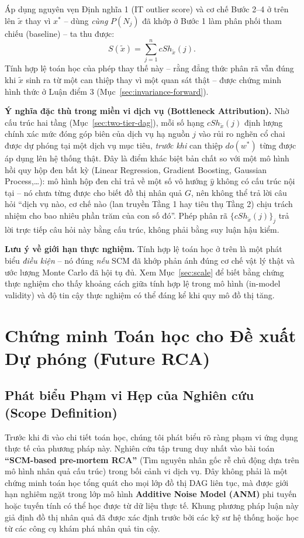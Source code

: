 \documentclass[11pt,a4paper]{article}
\begin{document}
Áp dụng nguyên vẹn Định nghĩa 1 (IT outlier score) và cơ chế Bước 2--4 ở trên lên $\tilde{x}$ thay vì $x^*$ -- dùng \emph{cùng} $P(N_j)$ đã khớp ở Bước 1 làm phân phối tham chiếu (baseline) -- ta thu được:
\begin{equation}
S(\tilde{x}) = \sum_{j=1}^{n} cSh_{\tilde{x}}(j).
\end{equation}
Tính hợp lệ toán học của phép thay thế này -- rằng đẳng thức phân rã vẫn đúng khi $\tilde{x}$ sinh ra từ một can thiệp thay vì một quan sát thật -- được chứng minh hình thức ở Luận điểm 3 (Mục~\ref{sec:invariance-forward}).

\textbf{Ý nghĩa đặc thù trong miền vi dịch vụ (Bottleneck Attribution).} Nhờ cấu trúc hai tầng (Mục~\ref{sec:two-tier-dag}), mỗi số hạng $cSh_{\tilde{x}}(j)$ định lượng chính xác mức đóng góp biên của dịch vụ hạ nguồn $j$ vào rủi ro nghẽn cổ chai được dự phóng tại một dịch vụ mục tiêu, \emph{trước khi} can thiệp $do(w^*)$ từng được áp dụng lên hệ thống thật. Đây là điểm khác biệt bản chất so với một mô hình hồi quy hộp đen bất kỳ (Linear Regression, Gradient Boosting, Gaussian Process,\dots): mô hình hộp đen chỉ trả về một số vô hướng $\hat{y}$ không có cấu trúc nội tại -- nó chưa từng được cho biết đồ thị nhân quả $G$, nên không thể trả lời câu hỏi ``dịch vụ nào, cơ chế nào (lan truyền Tầng 1 hay tiêu thụ Tầng 2) chịu trách nhiệm cho bao nhiêu phần trăm của con số đó''. Phép phân rã $\{cSh_{\tilde{x}}(j)\}_j$ trả lời trực tiếp câu hỏi này bằng cấu trúc, không phải bằng suy luận hậu kiểm.

\textbf{Lưu ý về giới hạn thực nghiệm.} Tính hợp lệ toán học ở trên là một phát biểu \emph{điều kiện} -- nó đúng \emph{nếu} SCM đã khớp phản ánh đúng cơ chế vật lý thật và ước lượng Monte Carlo đã hội tụ đủ. Xem Mục~\ref{sec:scale} để biết bằng chứng thực nghiệm cho thấy khoảng cách giữa tính hợp lệ trong mô hình (in-model validity) và độ tin cậy thực nghiệm có thể đáng kể khi quy mô đồ thị tăng.

\section{Chứng minh Toán học cho Đề xuất Dự phóng (Future RCA)}
\label{sec:future-rca}

\subsection{Phát biểu Phạm vi Hẹp của Nghiên cứu (Scope Definition)}
Trước khi đi vào chi tiết toán học, chúng tôi phát biểu rõ ràng phạm vi ứng dụng thực tế của phương pháp này. Nghiên cứu tập trung duy nhất vào bài toán \textbf{``SCM-based pre-mortem RCA''} (Tìm nguyên nhân gốc rễ chủ động dựa trên mô hình nhân quả cấu trúc) trong bối cảnh vi dịch vụ. Đây không phải là một chứng minh toán học tổng quát cho mọi lớp đồ thị DAG liên tục, mà được giới hạn nghiêm ngặt trong lớp mô hình \textbf{Additive Noise Model (ANM)} phi tuyến hoặc tuyến tính có thể học được từ dữ liệu thực tế. Khung phương pháp luận này giả định đồ thị nhân quả đã được xác định trước bởi các kỹ sư hệ thống hoặc học từ các công cụ khám phá nhân quả tin cậy.
\end{document}
